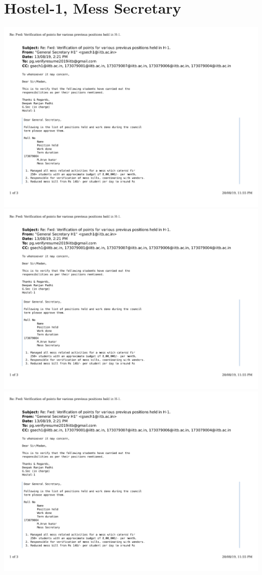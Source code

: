 \documentclass{article}
\begin{document}
\section{ Hostel-1, Mess Secretary}
	\includegraphics[page=1, scale=0.5]{proofs/h1_mess_work.pdf}\\
	\includegraphics[page=2, scale=0.5]{proofs/h1_mess_work.pdf}\\
	\includegraphics[page=3, scale=0.5]{proofs/h1_mess_work.pdf}\\
\end{document}
